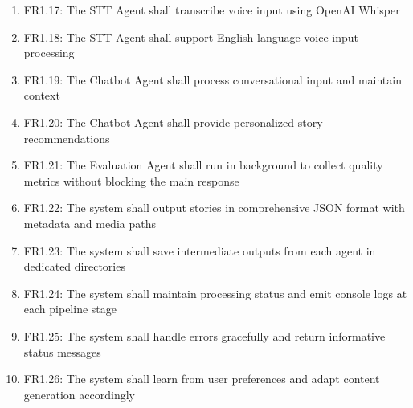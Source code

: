 \begin{enumerate}
    \item FR1.17: The STT Agent shall transcribe voice input using OpenAI Whisper
    \item FR1.18: The STT Agent shall support English language voice input processing
    \item FR1.19: The Chatbot Agent shall process conversational input and maintain context
    \item FR1.20: The Chatbot Agent shall provide personalized story recommendations
    \item FR1.21: The Evaluation Agent shall run in background to collect quality metrics without blocking the main response
    \item FR1.22: The system shall output stories in comprehensive JSON format with metadata and media paths
    \item FR1.23: The system shall save intermediate outputs from each agent in dedicated directories
    \item FR1.24: The system shall maintain processing status and emit console logs at each pipeline stage
    \item FR1.25: The system shall handle errors gracefully and return informative status messages
    \item FR1.26: The system shall learn from user preferences and adapt content generation accordingly
\end{enumerate}

